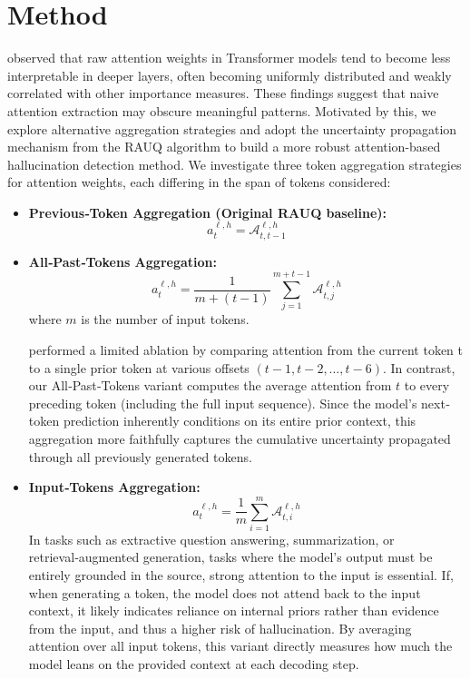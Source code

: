 \documentclass[letterpaper]{article} %
\begin{document}
\section{Method}
\citet{abnar-zuidema-2020-quantifying} observed that raw attention weights in Transformer models tend to become less interpretable in deeper layers, often becoming uniformly distributed and weakly correlated with other importance measures. These findings suggest that naive attention extraction may obscure meaningful patterns. Motivated by this, we explore alternative aggregation strategies and adopt the uncertainty propagation mechanism from the RAUQ algorithm to build a more robust attention-based hallucination detection method.
We investigate three token aggregation strategies for attention weights, each differing in the span of tokens considered:
\begin{itemize}
  \item \textbf{Previous‐Token Aggregation (Original RAUQ baseline):}
    {\footnotesize
    \begin{equation}
        a_t^{\ell,h} = \mathcal{A}^{\ell,h}_{t, t-1}
    \end{equation}}
          
  \item \textbf{All‐Past‐Tokens Aggregation:}
    {\footnotesize
    \begin{equation}
      a_t^{\ell,h} = \frac{1}{m + (t-1)} \sum_{j=1}^{m+t-1} \mathcal{A}^{\ell,h}_{t,j}
    \end{equation}}
    where \(m\) is the number of input tokens.

    \citet{vazhentsev2025uncertaintyawareattentionheadsefficient} performed a limited ablation by comparing attention from the current token t to a single prior token at various offsets $(t-1,t-2,\dots,t-6)$. In contrast, our All‑Past‑Tokens variant computes the average attention from $t$ to every preceding token (including the full input sequence). Since the model’s next‐token prediction inherently conditions on its entire prior context, this aggregation more faithfully captures the cumulative uncertainty propagated through all previously generated tokens.
  \item \textbf{Input‐Tokens Aggregation:}
    {\footnotesize
    \begin{equation}
      a_t^{\ell,h} = \frac{1}{m} \sum_{i=1}^{m} \mathcal{A}^{\ell,h}_{t,i}
    \end{equation}}
    In tasks such as extractive question answering, summarization, or retrieval‑augmented generation, tasks where the model’s output must be entirely grounded in the source, strong attention to the input is essential. If, when generating a token, the model does not attend back to the input context, it likely indicates reliance on internal priors rather than evidence from the input, and thus a higher risk of hallucination. By averaging attention over all input tokens, this variant directly measures how much the model leans on the provided context at each decoding step.
\end{itemize}
\end{document}
